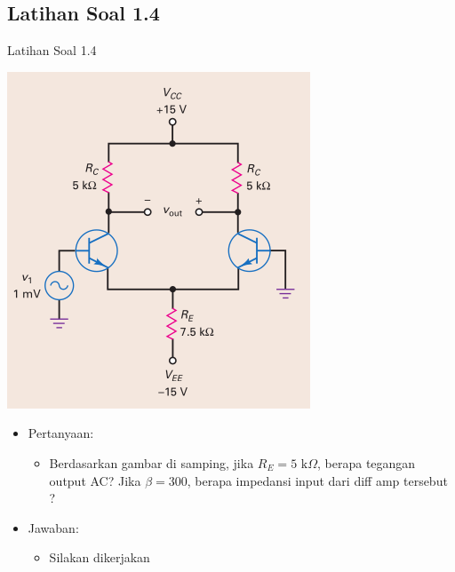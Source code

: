 \documentclass[aspectratio=169]{beamer}
\begin{document}
\subsection{Latihan Soal 1.4}
\begin{frame}{Latihan Soal 1.4}
	\begin{multicols}{2}
		\begin{center}
			\includegraphics[height=0.7\textheight]{gambar/01.contoh_soal_1-2}
		\end{center}
		\columnbreak
		\begin{itemize}
			\item Pertanyaan:
			\begin{itemize}
				\item Berdasarkan gambar di samping, jika $ R_E = 5 \text{ k}\Omega $, berapa tegangan output AC? Jika $ \beta = 300 $, berapa impedansi input dari diff amp tersebut ?
			\end{itemize}
			\item Jawaban:
			\begin{itemize}
				\item Silakan dikerjakan
			\end{itemize}
		\end{itemize}
	\end{multicols}
\end{frame}
\end{document}

